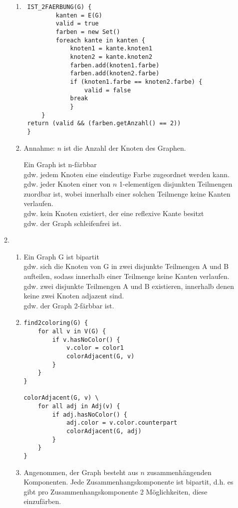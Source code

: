 \documentclass{article}
\begin{document}
\begin{enumerate}[\bfseries1.]
\begin{enumerate}
\begin{enumerate}
            \item  %
\begin{verbatim}
 IST_2FAERBUNG(G) {
         kanten = E(G)
         valid = true
         farben = new Set()
         foreach kante in kanten {
             knoten1 = kante.knoten1
             knoten2 = kante.knoten2
             farben.add(knoten1.farbe)
             farben.add(knoten2.farbe)
             if (knoten1.farbe == knoten2.farbe) {
                 valid = false
             break
             }
     }
 return (valid && (farben.getAnzahl() == 2))
 }
\end{verbatim}

            \item %
                Annahme: $n$ ist die Anzahl der Knoten des Graphen.
                
                Ein Graph ist n-färbbar
                \\gdw. jedem Knoten eine eindeutige Farbe zugeordnet werden
                kann.
                \\gdw. jeder Knoten einer von $n$ 1-elementigen disjunkten
                Teilmengen zuordbar ist, wobei innerhalb einer solchen Teilmenge
                keine Kanten verlaufen.
                \\gdw. kein Knoten existiert, der eine reflexive Kante besitzt 
                \\gdw. der Graph schleifenfrei ist.
        \end{enumerate}
    \item %
        \begin{enumerate}
            \item%
                Ein Graph G ist bipartit
                \\gdw. sich die Knoten von G in zwei disjunkte Teilmengen A und
                B aufteilen, sodass innerhalb einer Teilmenge keine Kanten
                verlaufen.
                \\gdw. zwei disjunkte Teilmengen A und B existieren, innerhalb
                denen keine zwei Knoten adjazent sind.
                \\gdw. der Graph 2-färbbar ist.
\newpage
            \item%
\begin{verbatim}
find2coloring(G) {
    for all v in V(G) {
        if v.hasNoColor() {
            v.color = color1
            colorAdjacent(G, v)
        }
    }
}

colorAdjacent(G, v) \
    for all adj in Adj(v) {
        if adj.hasNoColor() {        
            adj.color = v.color.counterpart
            colorAdjacent(G, adj)
        }
    }
}
\end{verbatim}
            \item %
                Angenommen, der Graph besteht aus $n$ zusammenhängenden
                Komponenten. Jede Zusammenhangskomponente ist bipartit, d.h. es
                gibt pro Zusammenhangskomponente 2 Möglichkeiten, diese
                einzufärben.
                

\end{enumerate}
\end{enumerate}
\end{enumerate}
\end{document}
